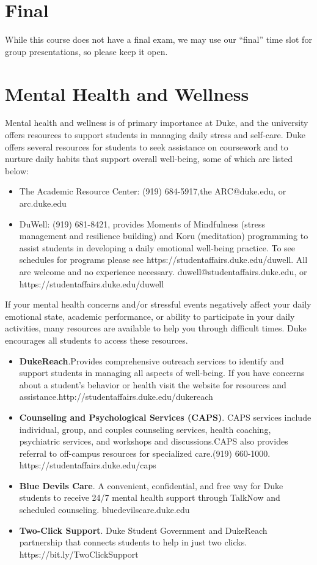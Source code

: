 \documentclass[12pt]{article}
\begin{document}
\section{Final}

While this course does not have a final exam, we may use our ``final'' time slot for group presentations, so please keep it open.

\section{Mental Health and Wellness}

Mental health and wellness is of primary importance at Duke, and the university offers resources to support students in managing daily stress and self-care. Duke offers several resources for students to seek assistance on coursework and to nurture daily habits that support overall well-being, some of which are listed below:

\begin{itemize}
	\item The Academic Resource Center: (919) 684-5917,the ARC@duke.edu, or arc.duke.edu
	\item DuWell: (919) 681-8421, provides Moments of Mindfulness (stress management and resilience building) and Koru (meditation) programming to assist students in developing a daily emotional well-being practice. To see schedules for programs please see https://studentaffairs.duke.edu/duwell. All are welcome and no experience necessary. duwell@studentaffairs.duke.edu, or https://studentaffairs.duke.edu/duwell
\end{itemize}

If your mental health concerns and/or stressful events negatively affect your daily emotional state, academic performance, or ability to participate in your daily activities, many resources are available to help you through difficult times. Duke encourages all students to access these resources.

\begin{itemize}
	\item \textbf{DukeReach}.Provides comprehensive outreach services to identify and support students in managing all aspects of well-being. If you have concerns about a student's behavior or health visit the website for resources and assistance.http://studentaffairs.duke.edu/dukereach
	\item \textbf{Counseling and Psychological Services (CAPS)}. CAPS services include individual, group, and couples counseling services, health coaching, psychiatric services, and workshops and discussions.CAPS also provides referral to off-campus resources for specialized care.(919) 660-1000. https://studentaffairs.duke.edu/caps
	\item \textbf{Blue Devils Care}. A convenient, confidential, and free way for Duke students to receive 24/7 mental health support through TalkNow and scheduled counseling. bluedevilscare.duke.edu
	\item \textbf{Two-Click Support}. Duke Student Government and DukeReach partnership that connects students to help in just two clicks.  https://bit.ly/TwoClickSupport
\end{itemize}
\end{document}
